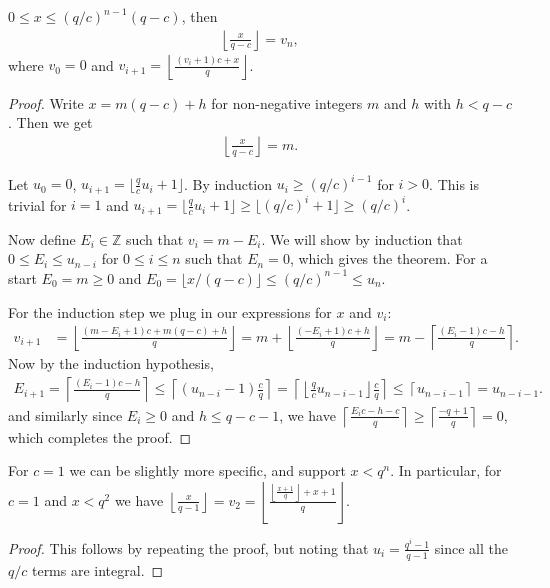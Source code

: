 \begin{theorem}
   $0\le x \le (q/c)^{n-1}(q-c)$,
   then
   \begin{align}
      \left\lfloor\frac{x}{q-c}\right\rfloor = v_n,
   \end{align}
   where $v_0 = 0$ and
   $v_{i+1} = \left\lfloor\frac{(v_i+1)c+x}{q}\right\rfloor$.
\end{theorem}
\begin{proof}
   Write $x = m(q-c)+h$ for non-negative integers $m$ and $h$ with $h<q-c$.
   Then we get
   \begin{align}
      \left\lfloor\frac{x}{q-c}\right\rfloor = m.
      \label{eq:floor}
   \end{align}

   Let $u_0=0$, $u_{i+1} = \lfloor\frac{q}{c}u_i+1\rfloor$.
   By induction $u_i \ge (q/c)^{i-1}$ for $i>0$.
   This is trivial for $i=1$ and $u_{i+1}=\lfloor \frac qc u_i +1\rfloor \ge \lfloor (q/c)^i + 1 \rfloor \ge (q/c)^i$.

   Now define $E_i\in\mathbb Z$ such that $v_i = m - E_i$.
   We will show by induction that $0\le E_{i} \le u_{n-i}$ for $0\le i\le n$ such that $E_n = 0$, which gives the theorem.
   For a start $E_0=m\ge 0$ and $E_0 = \lfloor x/(q-c)\rfloor \le (q/c)^{n-1} \le u_n$.

   For the induction step we plug in our expressions for $x$ and $v_i$:
   \begin{align}
      v_{i+1}
      &= \left\lfloor \frac{(m-E_i+1)c+m(q-c)+h}{q}\right\rfloor
    =
    m
    +
    \left\lfloor \frac{(- E_i+1)c +h}{q}\right\rfloor
    =
    m
    - \left\lceil \frac{(E_i-1)c - h}{q}\right\rceil.
   \end{align}
   Now by the induction hypothesis,
   \begin{align}
      E_{i+1}
      = \left\lceil \frac{(E_i-1)c - h}{q}\right\rceil
      \le\left\lceil (u_{n-i}-1)\frac{c}{q}\right\rceil
      = \left\lceil \left\lfloor \frac{q}{c}u_{n-i-1} \right\rfloor \frac{c}{q}\right\rceil
      \le \left\lceil u_{n-i-1}\right\rceil
      = u_{n-i-1}.
   \end{align}
   and similarly since $E_i \ge 0$ and $h\le q-c-1$,
   we have
   $\left\lceil \frac{E_ic - h - c}{q}\right\rceil \ge
   \left\lceil \frac{- q + 1}{q}\right\rceil = 0$, which completes the proof.
\end{proof}
\begin{corollary}
   For $c=1$ we can be slightly more specific, and support $x < q^n$.
   In particular, for $c=1$ and $x < q^2$ we have
   $
   \left\lfloor\frac{x}{q-1}\right\rfloor
   = v_2
   = \left\lfloor\frac{\left\lfloor\frac{x+1}{q}\right\rfloor+x+1}{q}\right\rfloor
   $.
\end{corollary}
\begin{proof}
   This follows by repeating the proof, but noting that $u_i = \frac{q^i-1}{q-1}$ since all the $q/c$ terms are integral.
\end{proof}
